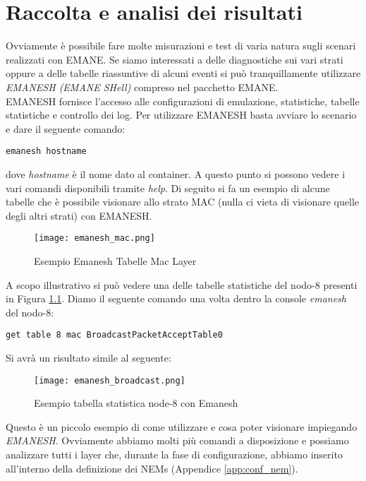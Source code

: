 \chapter{Raccolta e analisi dei risultati}
\label{cap:risultati}

Ovviamente è possibile fare molte misurazioni e test di varia natura sugli scenari realizzati con EMANE. Se siamo interessati a  delle diagnostiche sui vari strati oppure a delle tabelle riassuntive di alcuni eventi si può tranquillamente utilizzare \textit{EMANESH (EMANE SHell)} \cite{EMANESH} compreso nel pacchetto EMANE. \\
EMANESH fornisce l'accesso alle configurazioni di emulazione, statistiche, tabelle statistiche e controllo dei log. Per utilizzare EMANESH basta avviare lo scenario e dare il seguente comando:
\begin{verbatim}
emanesh hostname
\end{verbatim}
\noindent
dove \textit{hostname} è il nome dato al container. A questo punto si possono vedere i vari comandi disponibili tramite \textit{help}. Di seguito si fa un esempio di alcune tabelle che è possibile visionare allo strato MAC (nulla ci vieta di visionare quelle degli altri strati) con EMANESH.

\begin{figure}[H]
	\centering
	\texttt{[image: emanesh\_mac.png]}
	\caption{Esempio Emanesh Tabelle Mac Layer}
	\label{fig:emanesh_mac}
\end{figure}

A scopo illustrativo si può vedere una delle tabelle statistiche del nodo-8 presenti in Figura \ref{fig:emanesh_mac}. Diamo il seguente comando una volta dentro la console \textit{emanesh} del nodo-8:
\begin{verbatim}
get table 8 mac BroadcastPacketAcceptTable0
\end{verbatim}
Si avrà un risultato simile al seguente:

\begin{figure}[H]
	\centering
	\texttt{[image: emanesh\_broadcast.png]}
	\caption{Esempio tabella statistica node-8 con Emanesh}
	\label{fig:emanesh_broadcast}
\end{figure}

Questo è un piccolo esempio di come utilizzare e cosa poter visionare impiegando \textit{EMANESH}. Ovviamente abbiamo molti più comandi a disposizione e possiamo analizzare tutti i layer che, durante la fase di configurazione, abbiamo inserito all'interno della definizione dei NEMs (Appendice \ref{app:conf_nem}). \\

